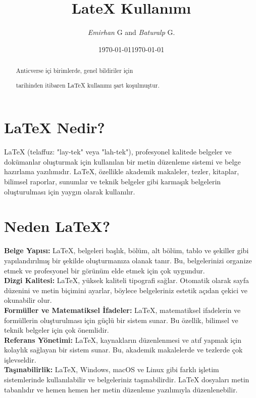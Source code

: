 \documentclass{article}
\title{LateX Kullanımı}
\author{\textit{Emirhan} G and \textit{Baturalp} G.}
\date{\today}
\begin{document}
\maketitle

\renewcommand{\abstractname}{Özet} %
\begin{abstract}
Anticverse içi birimlerde, genel bildiriler için \date{\today} tarihinden itibaren \LaTeX{} kullanımı şart koşulmuştur.
\end{abstract}

\section{LaTeX Nedir?}
LaTeX (telaffuz: "lay-tek" veya "lah-tek"), profesyonel kalitede belgeler ve dokümanlar oluşturmak için kullanılan bir metin düzenleme sistemi ve belge hazırlama yazılımıdır. LaTeX, özellikle akademik makaleler, tezler, kitaplar, bilimsel raporlar, sunumlar ve teknik belgeler gibi karmaşık belgelerin oluşturulması için yaygın olarak kullanılır.

\section{Neden LaTeX?}
\textbf{Belge Yapısı:} LaTeX, belgeleri başlık, bölüm, alt bölüm, tablo ve şekiller gibi yapılandırılmış bir şekilde oluşturmanıza olanak tanır. Bu, belgelerinizi organize etmek ve profesyonel bir görünüm elde etmek için çok uygundur.\\

\textbf{Dizgi Kalitesi:} LaTeX, yüksek kaliteli tipografi sağlar. Otomatik olarak sayfa düzenini ve metin biçimini ayarlar, böylece belgeleriniz estetik açıdan çekici ve okunabilir olur.\\

\textbf{Formüller ve Matematiksel İfadeler:} LaTeX, matematiksel ifadelerin ve formüllerin oluşturulması için güçlü bir sistem sunar. Bu özellik, bilimsel ve teknik belgeler için çok önemlidir.\\

\textbf{Referans Yönetimi:} LaTeX, kaynakların düzenlenmesi ve atıf yapmak için kolaylık sağlayan bir sistem sunar. Bu, akademik makalelerde ve tezlerde çok işlevseldir.\\

\textbf{Taşınabilirlik:} LaTeX, Windows, macOS ve Linux gibi farklı işletim sistemlerinde kullanılabilir ve belgeleriniz taşınabilirdir. LaTeX dosyaları metin tabanlıdır ve hemen hemen her metin düzenleme yazılımıyla düzenlenebilir.\\
\end{document}
